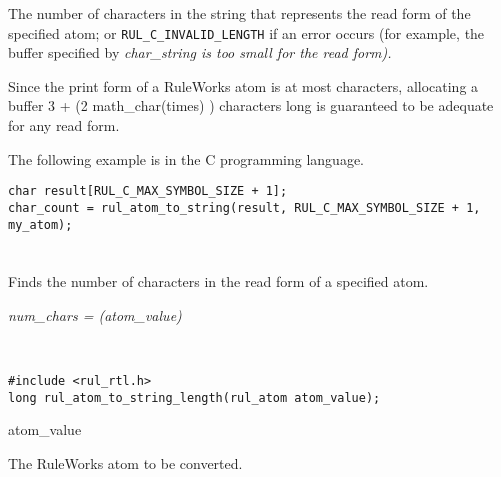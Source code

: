 \ReturnValue

The number of characters in the string that represents the read form
of the specified atom; or \verb|RUL_C_INVALID_LENGTH| if an error
occurs (for example, the buffer specified by \it{char\_string} is too
small for the read form).

Since the print form of a RuleWorks atom is at most
 characters, allocating a buffer 3 + (2
\co{<}math\_char\co{>}(times) ) characters long is
guaranteed to be adequate for any read form.

\Example

The following example is in the C programming language.
\begin{verbatim}
char result[RUL_C_MAX_SYMBOL_SIZE + 1];
char_count = rul_atom_to_string(result, RUL_C_MAX_SYMBOL_SIZE + 1, my_atom);
\end{verbatim}

\begin{seealso}

\end{seealso}

\section*{}

Finds the number of characters in the read form of a specified atom.

\Syntax

\it{num\_chars} = (\it{atom\_value})

\begin{args}
   \\
\end{args}

\CBinding
\begin{verbatim}
#include <rul_rtl.h>
long rul_atom_to_string_length(rul_atom atom_value);
\end{verbatim}

\begin{argument}
\item[atom\_value]
  
  The RuleWorks atom to be converted.
\end{argument}
  
\ReturnValue

